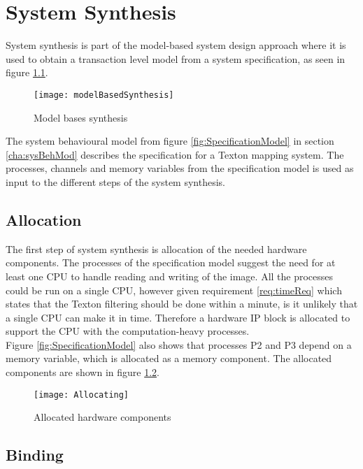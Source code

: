 \chapter{System Synthesis}
System synthesis is part of the model-based system design approach where it is used to obtain a transaction level model from a system specification, as seen in figure \ref{fig:modelBasedSyn}. 

\begin{figure}[H]
\centering
\texttt{[image: modelBasedSynthesis]}
\caption{Model bases synthesis}
\label{fig:modelBasedSyn}
\end{figure}

The system behavioural model from figure \ref{fig:SpecificationModel} in section \ref{cha:sysBehMod} describes the specification for a Texton mapping system. 
The processes, channels and memory variables from the specification model is used as input to the different steps of the system synthesis.  

\section{Allocation}
The first step of system synthesis is allocation of the needed hardware components. 
The processes of the specification model suggest the need for at least one CPU to handle reading and writing of the image. 
All the processes could be run on a single CPU, however given requirement \ref{req:timeReq} which states that the Texton filtering should be done within a minute, is it unlikely that a single CPU can make it in time. 
Therefore a hardware IP block is allocated to support the CPU with the computation-heavy processes.
\\Figure \ref{fig:SpecificationModel} also shows that processes P2 and P3 depend on a memory variable, which is allocated as a memory component. The allocated components are shown in figure \ref{fig:allocHardComps}.

\begin{figure}[H]
\centering
\texttt{[image: Allocating]}
\caption{Allocated hardware components}
\label{fig:allocHardComps}
\end{figure}




\section{Binding}

